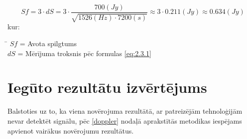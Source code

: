 \begin{equation}
Sf = 3 \cdot dS = 3 \cdot \frac{700 (Jy)}{ \sqrt{1526 (Hz) \cdot 7200 (s) } }\approx 3 \cdot 0.211 (Jy) \approx 0.634 (Jy) \tag{2.3.2}\label{eq:2.3.2} 
\end{equation}
kur: 
\begin{tabbing}
\phantom{\hspace{15mm}}\= \kill
$Sf$\> = Avota spilgtums \\
$dS$\>   = Mērījuma troksnis pēc formulas \ref{eq:2.3.1}\\

\end{tabbing}




\section{Iegūto rezultātu izvērtējums} \label{result-eval}




Balstoties uz to, ka viena novērojuma rezultātā, ar patreizējām tehnoloģijām nevar detektēt signālu, pēc \ref{doppler} nodaļā aprakstītās metodikas iespējams apvienot vairākus novērojumu rezultātus. 

